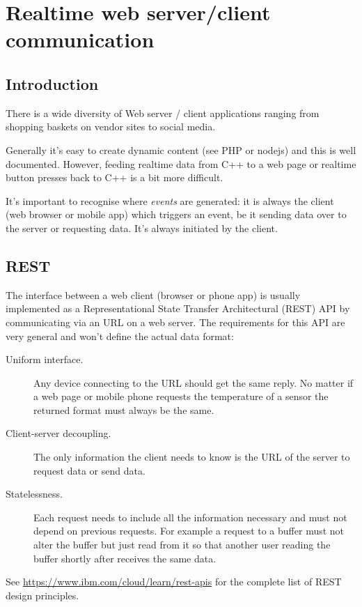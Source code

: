 \documentclass[12pt]{report}
\begin{document}
\chapter{Realtime web server/client communication\label{webserver}}

\section{Introduction}

There is a wide diversity of Web server / client applications
ranging from shopping baskets on vendor sites to social
media.

Generally it's easy to create dynamic content (see PHP or nodejs) and this is well
documented. However, feeding realtime data from C++ to a web page or
realtime button presses back to C++ is a bit more difficult.

It's important to recognise where \textsl{events} are generated: it is
always the client (web browser or mobile app) which triggers an event,
be it sending data over to the server or requesting data. It's
always initiated by the client.

\section{REST}
The interface between a web client (browser or phone app) is usually
implemented as a Representational State Transfer Architectural (REST)
API by communicating via an URL on a web server. The requirements
for this API are very general and won't define the actual data format:
\begin{description}
\item[Uniform interface.] Any device connecting to the URL should
  get the same reply. No matter if a web page or mobile phone
  requests the temperature of a sensor the returned format must always be the same.
\item[Client-server decoupling.] The only information
  the client needs to know is the URL of the server to request data or send data.
\item[Statelessness.] Each request needs to include all the
  information necessary and must not depend on previous requests. For
  example a request to a buffer must not alter the
  buffer but just read from it so that another user reading the buffer
  shortly after receives the same data.
\end{description}
See \url{https://www.ibm.com/cloud/learn/rest-apis} for the complete
list of REST design principles.
\end{document}
